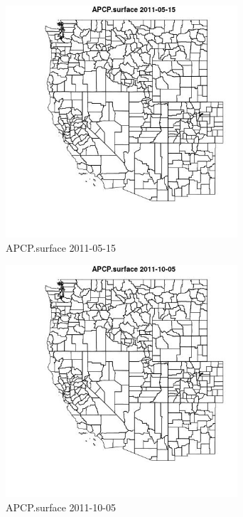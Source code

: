 \begin{figure} 
\centering  
\includegraphics[width=0.77\textwidth]{Code_Outputs/ML_input_report_ML_input_PM25_Step5_part_d_de_duplicated_aves_ML_input_MapObsAPCPsurface2011-05-15.jpg} 
\caption{\label{fig:ML_input_report_ML_input_PM25_Step5_part_d_de_duplicated_aves_ML_inputMapObsAPCPsurface2011-05-15}APCP.surface 2011-05-15} 
\end{figure} 
 

\begin{figure} 
\centering  
\includegraphics[width=0.77\textwidth]{Code_Outputs/ML_input_report_ML_input_PM25_Step5_part_d_de_duplicated_aves_ML_input_MapObsAPCPsurface2011-10-05.jpg} 
\caption{\label{fig:ML_input_report_ML_input_PM25_Step5_part_d_de_duplicated_aves_ML_inputMapObsAPCPsurface2011-10-05}APCP.surface 2011-10-05} 
\end{figure} 
 

